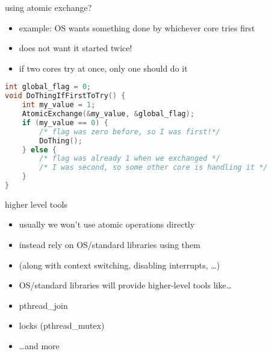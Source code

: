 \begin{frame}[fragile]{using atomic exchange?}
    \begin{itemize}
    \item example: OS wants something done by whichever core tries first
    \item does not want it started twice!
    \item if two cores try at once, only one should do it
    \end{itemize}
\begin{lstlisting}[language=C,style=smaller]
int global_flag = 0;
void DoThingIfFirstToTry() {
    int my_value = 1;
    AtomicExchange(&my_value, &global_flag);
    if (my_value == 0) {
        /* flag was zero before, so I was first!*/
        DoThing();
    } else {
        /* flag was already 1 when we exchanged */
        /* I was second, so some other core is handling it */
    }
}
\end{lstlisting}
\end{frame}

\begin{frame}{higher level tools}
    \begin{itemize}
        \item usually we won't use atomic operations directly
        \item instead rely on OS/standard libraries using them
        \item (along with context switching, disabling interrupts, \ldots)
        \item OS/standard libraries will provide higher-level tools like\ldots
            \vspace{.5cm}
        \item pthread\_join
        \item locks (pthread\_mutex)
        \item \ldots and more
    \end{itemize}
\end{frame}
